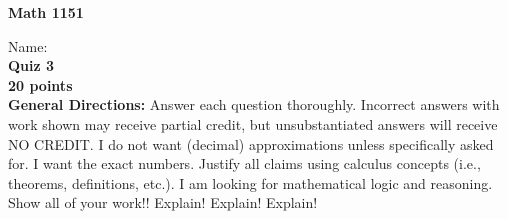 \documentclass[addpoints,12pt]{exam}
\begin{document}
	\noindent\begin{large}\textbf{Math 1151}\end{large}
	\hspace{2in} Name:\hrulefill\\
	\textbf{Quiz 3}\\
	\textbf{20 points} \\
  
	\noindent\textbf{General Directions:}  Answer each question thoroughly.  Incorrect answers with work shown may receive partial credit, but unsubstantiated answers will receive NO CREDIT.  I do not want (decimal) approximations unless specifically asked for.  I want the exact numbers.  Justify all claims using calculus concepts (i.e., theorems, definitions, etc.).  I am looking for mathematical logic and reasoning.  Show all of your work!! Explain!  Explain!  Explain!  
	
\end{document}
